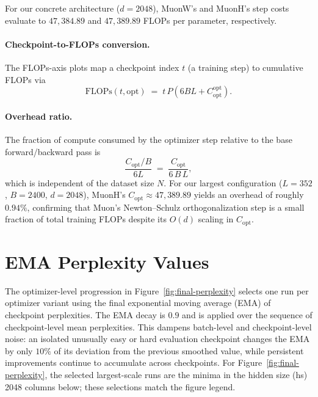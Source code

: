 \documentclass{article}
\begin{document}
For our concrete architecture ($d = 2048$), MuonW's and MuonH's step costs evaluate to $47{,}384.89$ and $47{,}389.89$ FLOPs per parameter, respectively.

\paragraph{Checkpoint-to-FLOPs conversion.} The FLOPs-axis plots map a checkpoint index $t$ (a training step) to cumulative FLOPs via
\[
\mathrm{FLOPs}(t, \text{opt}) \;=\; t\,P\!\left(6BL + C_{\text{opt}}^{\text{opt}}\right).
\]

\paragraph{Overhead ratio.} The fraction of compute consumed by the optimizer step relative to the base forward/backward pass is
\[
\frac{C_{\text{opt}}/B}{6L} \;=\; \frac{C_{\text{opt}}}{6\,B\,L},
\]
which is independent of the dataset size $N$. For our largest configuration ($L = 352$, $B = 2400$, $d = 2048$), MuonH's $C_{\text{opt}} \approx 47{,}389.89$ yields an overhead of roughly $0.94\%$, confirming that Muon's Newton--Schulz orthogonalization step is a small fraction of total training FLOPs despite its $O(d)$ scaling in $C_{\text{opt}}$.


\section{EMA Perplexity Values}
\label{app:ema-perplexity}

The optimizer-level progression in Figure~\ref{fig:final-perplexity} selects one run per optimizer variant using the final exponential moving average (EMA) of checkpoint perplexities. The EMA decay is $0.9$ and is applied over the sequence of checkpoint-level mean perplexities. This dampens batch-level and checkpoint-level noise: an isolated unusually easy or hard evaluation checkpoint changes the EMA by only $10\%$ of its deviation from the previous smoothed value, while persistent improvements continue to accumulate across checkpoints. For Figure~\ref{fig:final-perplexity}, the selected largest-scale runs are the minima in the hidden size (hs) 2048 columns below; these selections match the figure legend.
\end{document}
